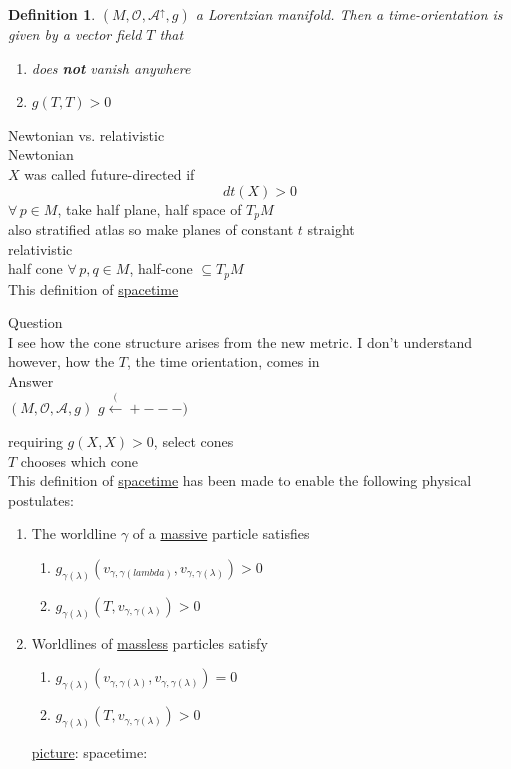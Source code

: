 \documentclass[10pt]{amsart}
\newtheorem{definition}{Definition}
\begin{document}
\begin{multicols*}{2}
	\begin{definition}
		$(M,\mathcal{O},\mathcal{A}^{\uparrow},g)$ a Lorentzian manifold.  Then a time-orientation is given by a vector field $T$ that 
		\begin{enumerate}
			\item[(i)] does \textbf{not} vanish anywhere 
			\item[(ii)] $g(T,T)>0$
		\end{enumerate}
	\end{definition}
	
	Newtonian vs. relativistic \\
	Newtonian \\
	$X$ was called future-directed if 
	\[
	dt(X) >0
	\]
	$\forall \, p \in M$, take half plane, half space of $T_pM$ \\
	also stratified atlas so make planes of constant $t$ straight \\
	relativistic \\
	half cone $\forall \, p, q \in M$, half-cone $\subseteq T_pM$ \\
	
	This definition of \underline{spacetime}
	
	Question \\
	I see how the cone structure arises from the new metric. I don't understand however, how the $T$, the time orientation, comes in \\
	
	Answer \\
	$(M,\mathcal{O}, \mathcal{A},g)$ $g \xleftarrow (+---)$
	
	requiring $g(X,X)>0$, select cones \\
	$T$ chooses which cone \\
	
	This definition of \underline{spacetime} has been made to enable the following physical postulates:
	\begin{enumerate}
		\item[(P1)] The worldline $\gamma$ of a \underline{massive} particle satisfies
		\begin{enumerate}
			\item[(i)] $g_{\gamma(\lambda)}(v_{\gamma, \gamma(lambda)} , v_{\gamma,\gamma(\lambda)} ) >0$
			\item[(ii)] $g_{\gamma(\lambda)}(T, v_{\gamma,\gamma(\lambda)}) >0$
		\end{enumerate}
		\item[(P2)] Worldlines of \underline{massless} particles satisfy
		\begin{enumerate}
			\item[(i)] $g_{\gamma(\lambda)}(v_{\gamma,\gamma(\lambda)}, v_{\gamma,\gamma(\lambda)}) = 0$
			\item[(ii)] $g_{\gamma(\lambda)}(T,v_{\gamma,\gamma(\lambda)}) >0$
		\end{enumerate}
		\underline{picture}: spacetime:
	\end{enumerate}
	

\end{multicols*}
\end{document}
